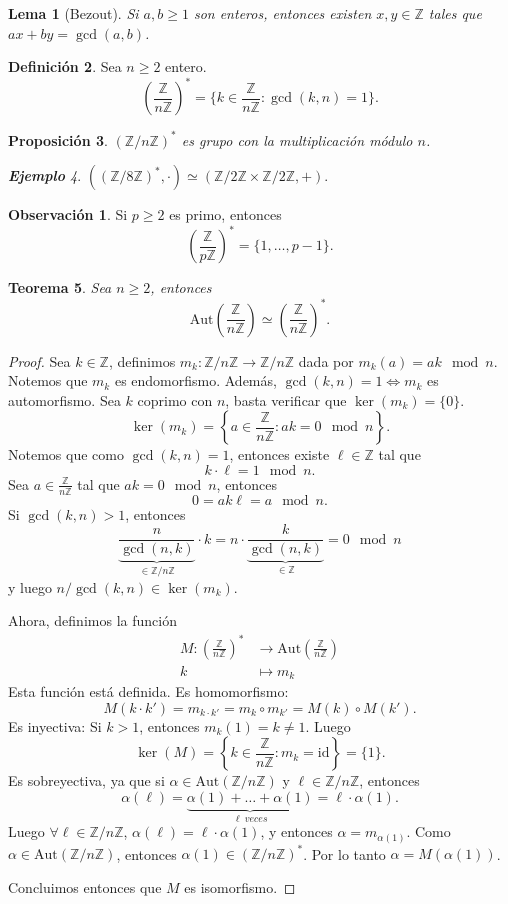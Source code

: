 \documentclass{article}
\newtheorem{theorem}{Teorema}[subsection]
\newtheorem{proposition}[theorem]{Proposición}
\newtheorem{lemma}[theorem]{Lema}
\theoremstyle{definition}
\newtheorem{definition}[theorem]{Definición}
\newtheorem*{obs}{Observación}
\theoremstyle{remark}
\newtheorem{example}[theorem]{\textbf{Ejemplo}}
\numberwithin{equation}{section}
\newcommand{\Z}{\mathbb{Z}}
\renewcommand{\a}{\alpha}
\renewcommand{\c}{\cdot}
\newcommand{\id}{\mathrm{id}}
\newcommand{\Aut}{\mathrm{Aut}}
\newcommand{\br}[1]{\left( #1 \right)}
\newcommand{\set}[1]{\left\{ #1 \right\}}
\newcommand{\znz}[1]{\frac{\Z}{#1 \Z}}
\newcommand{\zmz}[1]{\Z/ #1 \Z}
\newcommand{\olon}{\colon}
\begin{document}
\begin{lemma}[Bezout]
  Si $a,b \geq 1$ son enteros, entonces existen $x,y \in \Z$ tales que $ax+by = \gcd(a,b)$.
\end{lemma}

\begin{definition}
  Sea $n \geq 2$ entero. 
  \[ \br{\znz n}^* = \{k \in \znz n \colon \gcd(k,n) = 1\}. \]
\end{definition}

\begin{proposition}
  $(\zmz n)^*$ es grupo con la multiplicación módulo $n$.
\end{proposition}

\begin{example}
  $((\zmz8)^*, \c) \simeq (\zmz2 \times \zmz2, +)$.
\end{example}

\begin{obs}
  Si $p \geq 2$ es primo, entonces 
  \[ \br{\znz p}^* = \{1,\dots, p-1\}. \]
\end{obs}

\begin{theorem}
  Sea $n \geq 2$, entonces 
  \[ \Aut\br{\znz n} \simeq \br{\znz n}^*. \]
\end{theorem}
\begin{proof}
  Sea $k \in \Z$, definimos $m_k \colon \zmz n \to \zmz n$ dada por $m_k(a) = ak \mod n$.
  Notemos que $m_k$ es endomorfismo. Además, $\gcd(k,n) = 1 \iff m_k$ es automorfismo.
  Sea $k$ coprimo con $n$, basta verificar que $\ker(m_k) = \{0\}$. 
  \[ \ker(m_k) = \set{a \in \znz n \colon ak = 0 \mod n}. \]
  Notemos que como $\gcd(k,n) = 1$, entonces existe $\ell \in \Z$ tal que $$k \c \ell = 1 \mod n.$$
  Sea $a \in \znz n$ tal que $ak = 0 \mod n$, entonces
  \[ 0 = ak \ell = a \mod n. \]
  Si $\gcd(k,n) > 1$, entonces 
  \[ \underbrace{\frac{n}{\gcd(n,k)}}_{\in \zmz n} \c k = n \c \underbrace{\frac{k}{\gcd(n,k)}}_{\in \Z} = 0 \mod n \]
  y luego $n/\gcd(k,n) \in \ker(m_k)$.

  Ahora, definimos la función 
  \begin{align*}
      M \colon \br{\znz n}^* &\to \Aut\br{\znz n} \\ 
      k &\mapsto m_k
  \end{align*}
  Esta función está definida. Es homomorfismo: 
  \[ M(k \c k') = m_{k \c k'} = m_k \circ m_{k'} = M(k) \circ M(k'). \]
  Es inyectiva: Si $k >1$, entonces $m_k(1) = k \neq 1$. Luego 
  \[ \ker(M) = \set{k \in \znz n \olon m_k = \id} = \{1\}. \]
  Es sobreyectiva, ya que si $\a \in \Aut(\zmz n)$ y $\ell \in \zmz n$, entonces 
  \[ \a(\ell) = \underbrace{\a(1) + \dots + \a(1)}_{\ell \ veces} = \ell \c \a(1). \]
  Luego $\forall \ell \in \zmz n$, $\a(\ell) = \ell \c \a(1)$, y entonces $\a = m_{\a(1)}$. Como $\a \in \Aut(\zmz n)$, entonces $\a(1) \in (\zmz n)^*$. Por lo tanto $\a = M(\a(1))$.

  Concluimos entonces que $M$ es isomorfismo.
\end{proof}
\end{document}
